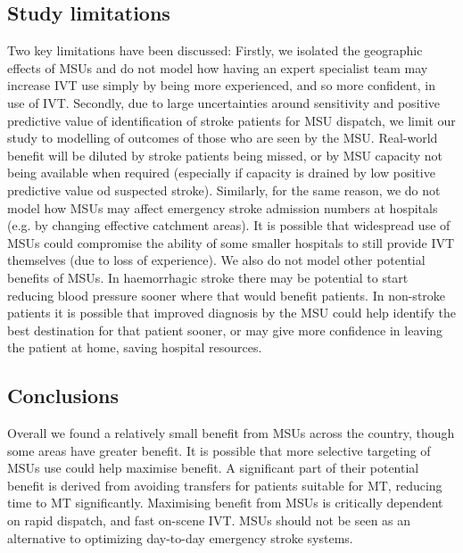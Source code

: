 \subsection{Study limitations}

Two key limitations have been discussed: Firstly, we isolated the geographic effects of MSUs and do not model how having an expert specialist team may increase IVT use simply by being more experienced, and so more confident, in use of IVT. Secondly, due to large uncertainties around sensitivity and positive predictive value of identification of stroke patients for MSU dispatch, we limit our study to modelling of outcomes of those who are seen by the MSU. Real-world benefit will be diluted by stroke patients being missed, or by MSU capacity not being available when required (especially if capacity is drained by low positive predictive value od suspected stroke). Similarly, for the same reason, we do not model how MSUs may affect emergency stroke admission numbers at hospitals (e.g. by changing effective catchment areas). It is possible that widespread use of MSUs could compromise the ability of some smaller hospitals to still provide IVT themselves (due to loss of experience). We also do not model other potential benefits of MSUs. In haemorrhagic stroke there may be potential to start reducing blood pressure sooner where that would benefit patients. In non-stroke patients it is possible that improved diagnosis by the MSU could help identify the best destination for that patient sooner, or may give more confidence in leaving the patient at home, saving hospital resources.

\subsection{Conclusions}

Overall we found a relatively small benefit from MSUs across the country, though some areas have greater benefit. It is possible that more selective targeting of MSUs use could help maximise benefit. A significant part of their potential benefit is derived from avoiding transfers for patients suitable for MT, reducing time to MT significantly. Maximising benefit from MSUs is critically dependent on rapid dispatch, and fast on-scene IVT. MSUs should not be seen as an alternative to optimizing day-to-day emergency stroke systems.